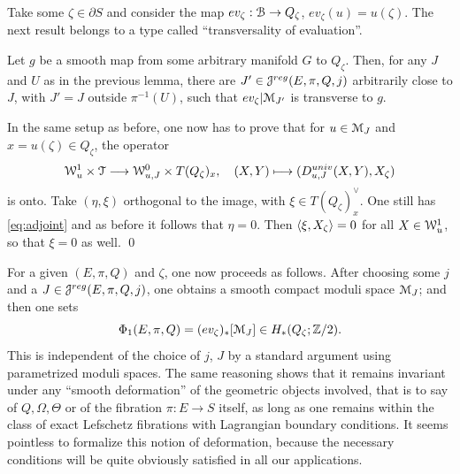 \documentclass[10pt,letterpaper]{article}
\begin{document}
Take some $\zeta \in \partial S$ and consider the map $ev_\zeta: \mathcal{B}
\rightarrow Q_\zeta$, $ev_\zeta(u) = u(\zeta)$. The next result belongs to a
type called ``transversality of evaluation''.

\begin{lemma} \label{th:ev-transversality}
Let $g$ be a smooth map from some arbitrary manifold $G$ to $Q_\zeta$. Then,
for any $J$ and $U$ as in the previous lemma, there are $J' \in
\mathcal{J}^{reg}(E,\pi,Q,j)$ arbitrarily close to $J$, with $J' = J$ outside
$\pi^{-1}(U)$, such that $ev_\zeta|\mathcal{M}_{J'}$ is transverse to $g$.
\end{lemma}

\proof In the same setup as before, one now has to prove that for $u \in \mathcal{M}_J$
and $x = u(\zeta) \in Q_\zeta$, the operator
\[
\mathcal{W}^1_u \times \mathcal{T} \longrightarrow \mathcal{W}^0_{u,J} \times T(Q_\zeta)_x, \quad (X,Y)
\longmapsto (D^{univ}_{u,J}(X,Y),X_\zeta)
\]
is onto. Take $(\eta,\xi)$ orthogonal to the image, with $\xi \in
T(Q_\zeta)_x^\vee$. One still has \eqref{eq:adjoint} and as before it follows
that $\eta = 0$. Then $\langle \xi, X_{\zeta} \rangle = 0$ for all $X \in
\mathcal{W}^1_u$, so that $\xi = 0$ as well. \qed

For a given $(E,\pi,Q)$ and $\zeta$, one now proceeds as follows. After
choosing some $j$ and a $J \in \mathcal{J}^{reg}(E,\pi,Q,j)$, one obtains a smooth compact
moduli space $\mathcal{M}_J$; and then one sets
\[
\Phi_1(E,\pi,Q) = (ev_\zeta)_*[\mathcal{M}_J] \in H_*(Q_\zeta;\mathbb{Z}/2).
\]
This is independent of the choice of $j$, $J$ by a standard argument using
parame\-trized moduli spaces. The same reasoning shows that it remains
invariant under any ``smooth deformation'' of the geometric objects involved,
that is to say of $Q,\Omega,\Theta$ or of the fibration $\pi: E \rightarrow S$
itself, as long as one remains within the class of exact Lefschetz fibrations
with Lagrangian boundary conditions. It seems pointless to formalize this
notion of deformation, because the necessary conditions will be quite obviously
satisfied in all our applications.
\end{document}
